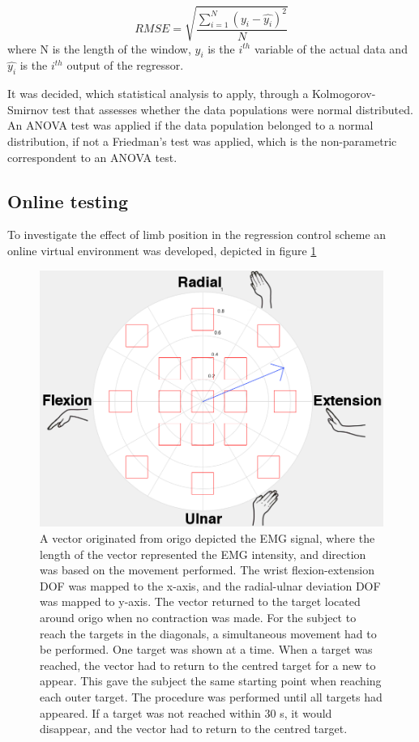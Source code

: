 \begin{multicols}{2}
\begin{equation} \label{eq:rmse}
RMSE = \sqrt{\frac{\sum\limits_{i=1}^N(y_i - \hat{y_i})^2}{N}}
\end{equation}
where N is the length of the window, $y_i$ is the $i^{th}$ variable of the actual data and $\hat{y_i}$ is the $i^{th}$ output of the regressor.

It was decided, which statistical analysis to apply, through a Kolmogorov-Smirnov test that assesses whether the data populations were normal distributed. An ANOVA test was applied if the data population belonged to a normal distribution, if not a Friedman's test was applied, which is the non-parametric correspondent to an ANOVA test.

\subsection*{Online testing}
To investigate the effect of limb position in the regression control scheme an online virtual environment was developed, depicted in figure \ref{fig:targets}

\begin{figure}[H]
	\centering
	\includegraphics[scale=0.25]{figures/paperFigures/Target}
	\caption{A vector originated from origo depicted the EMG signal, where the length of the vector represented the EMG intensity, and direction was based on the movement performed. The wrist flexion-extension DOF was mapped to the x-axis, and the radial-ulnar deviation DOF was mapped to y-axis. The vector returned to the target located around origo when no contraction was made. For the subject to reach the targets in the diagonals, a simultaneous movement had to be performed. One target was shown at a time. When a target was reached, the vector had to return to the centred target for a new to appear. This gave the subject the same starting point when reaching each outer target. The procedure was performed until all targets had appeared. If a target was not reached within 30 s, it would disappear, and the vector had to return to the centred target.}
	\label{fig:targets}
\end{figure}


\end{multicols}
